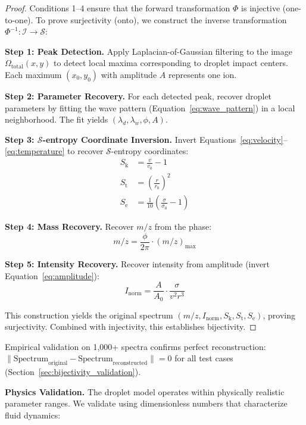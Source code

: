 \documentclass[11pt,twocolumn]{article}
\newcommand{\sentropy}{$\mathcal{S}$-entropy}
\newcommand{\Sk}{S_{\text{k}}}
\newcommand{\St}{S_{\text{t}}}
\newcommand{\Se}{S_{\text{e}}}
\begin{document}
\begin{proof}
Conditions 1--4 ensure that the forward transformation $\Phi$ is injective (one-to-one). To prove surjectivity (onto), we construct the inverse transformation $\Phi^{-1}: \mathcal{I} \rightarrow \mathcal{S}$:

\textbf{Step 1: Peak Detection.} Apply Laplacian-of-Gaussian filtering to the image $\Omega_{\text{total}}(x, y)$ to detect local maxima corresponding to droplet impact centers. Each maximum $(x_0, y_0)$ with amplitude $A$ represents one ion.

\textbf{Step 2: Parameter Recovery.} For each detected peak, recover droplet parameters by fitting the wave pattern (Equation~\ref{eq:wave_pattern}) in a local neighborhood. The fit yields $(\lambda_d, \lambda_w, \phi, A)$.

\textbf{Step 3: \sentropy{} Coordinate Inversion.} Invert Equations~\ref{eq:velocity}--\ref{eq:temperature} to recover \sentropy{} coordinates:
\begin{align}
    \Sk &= \frac{v}{v_0} - 1 \\
    \St &= \left(\frac{r}{r_0}\right)^2 \\
    \Se &= \frac{1}{10}\left(\frac{\sigma}{\sigma_0} - 1\right)
\end{align}

\textbf{Step 4: Mass Recovery.} Recover $m/z$ from the phase:
\begin{equation}
    m/z = \frac{\phi}{2\pi} \cdot (m/z)_{\max}
\end{equation}

\textbf{Step 5: Intensity Recovery.} Recover intensity from amplitude (invert Equation~\ref{eq:amplitude}):
\begin{equation}
    I_{\text{norm}} = \frac{A}{A_0} \cdot \frac{\sigma}{v^2 r^3}
\end{equation}

This construction yields the original spectrum $(m/z, I_{\text{norm}}, \Sk, \St, \Se)$, proving surjectivity. Combined with injectivity, this establishes bijectivity.
\end{proof}

Empirical validation on 1,000+ spectra confirms perfect reconstruction: $\| \text{Spectrum}_{\text{original}} - \text{Spectrum}_{\text{reconstructed}} \| = 0$ for all test cases (Section~\ref{sec:bijectivity_validation}).

\textbf{Physics Validation.} The droplet model operates within physically realistic parameter ranges. We validate using dimensionless numbers that characterize fluid dynamics:
\end{document}
